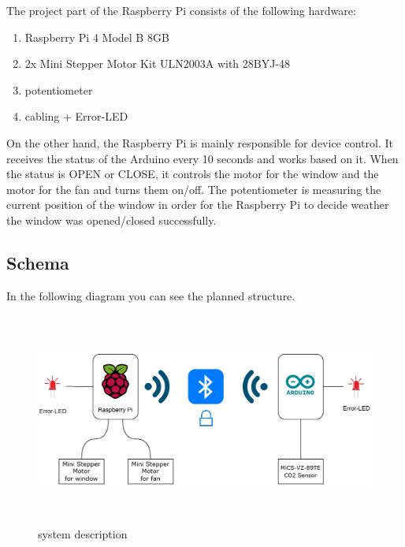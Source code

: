 The project part of the Raspberry Pi consists of the following hardware:

\begin{enumerate}[label*=\arabic*.]
    \item \label{io.1} Raspberry Pi 4 Model B 8GB
    \item \label{io.2} 2x Mini Stepper Motor Kit ULN2003A with 28BYJ-48
    \item \label{io.3} potentiometer
    \item \label{io.4} cabling + Error-LED
\end{enumerate}

On the other hand, the Raspberry Pi is mainly responsible for device control. It receives the status of the Arduino every 10 seconds and works based on it. When the status is OPEN or CLOSE, it controls the motor for the window and the motor for the fan and turns them on/off. The potentiometer is measuring the current position of the window in order for the Raspberry Pi to decide weather the window was opened/closed successfully.

\newpage

\subsection{Schema}

In the following diagram you can see the planned structure.

\begin{figure}[h]
	\includegraphics[height=70mm]{images/schema_technologien.jpg}
	\centering
	\caption{system description}
	\label{fig:system}
\end{figure}






